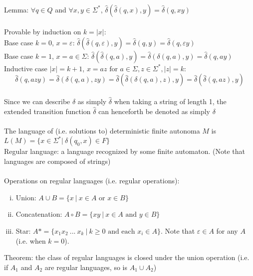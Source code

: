 \documentclass{article}
\newcommand*{\<}{\langle}
\renewcommand*{\>}{\rangle}
\begin{document}
			\\
			Lemma: $\forall q \in Q$ and $\forall x, y \in \Sigma^*$, $\hat{\delta}(\hat{\delta}(q, x), y) = \hat{\delta}(q, xy)$ \\
			\\
			Provable by induction on $k = |x|$: \\
			Base case $k = 0$, $x = \varepsilon$: $\hat{\delta}(\hat{\delta}(q, \varepsilon), y) = \hat{\delta}(q, y) = \hat{\delta}(q, \varepsilon y)$ \\
			Base case $k = 1$, $x = a \in \Sigma$: $\hat{\delta}(\hat{\delta}(q, a), y) = \hat{\delta}(\delta(q, a), y) = \hat{\delta}(q, ay)$ \\
			Inductive case $|x| = k + 1$, $x = az \text{ for } a \in \Sigma, z \in \Sigma^*, |z| = k$: \\
			\begin{equation*}
				\hat{\delta}(q, azy) = \hat{\delta}(\delta(q, a), zy) = \hat{\delta}(\hat{\delta}(\delta(q, a), z), y) = \hat{\delta}(\hat{\delta}(q, az), y)
				\end{equation*}
			\\
			Since we can describe $\delta$ as simply $\hat{\delta}$ when taking a string of length 1, the extended transition function $\hat{\delta}$ can henceforth be denoted as simply $\delta$ \\
			\\
			The language of (i.e. solutions to) deterministic finite autonoma $M$ is $L(M) = \{x \in \Sigma^* |\: \delta(q_0, x) \in F \}$ \\
			Regular language: a language recognized by some finite automaton. (Note that languages are composed of strings) \\
			\\
			Operations on regular languages (i.e. regular operations):
			\begin{enumerate}[(i)]
				\item Union: $A \cup B = \{x\:|\:x \in A \text{ or } x \in B\}$
				\item Concatenation: $A \circ B = \{xy\:|\:x \in A \text{ and } y \in B\}$
				\item Star: $A* = \{x_1x_2\:...\:x_k\:|\:k \geq 0 \text{ and each } x_i \in A\}$. Note that $\varepsilon \in A$ for any $A$ (i.e. when $k = 0$).
				\end{enumerate}
			Theorem: the class of regular languages is closed under the union operation (i.e. if $A_1$ and $A_2$ are regular languages, so is $A_1 \cup A_2$) \\
			\\
\end{document}
